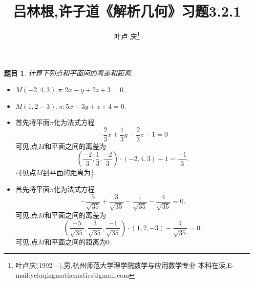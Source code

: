 \documentclass[a4paper]{article}
\newtheorem*{exe}{题目}
\newenvironment{exercise}
{\bigskip\begin{mdframed}\begin{exe}}
    {\end{exe}\end{mdframed}\bigskip}
\begin{document}
\title{\huge{\bf{吕林根,许子道《解析几何》习题3.2.1}}} \author{\small{叶卢
    庆\footnote{叶卢庆(1992---),男,杭州师范大学理学院数学与应用数学专业
      本科在读,E-mail:yeluqingmathematics@gmail.com}}}
\maketitle
\begin{exercise}
计算下列点和平面间的离差和距离.
\begin{itemize}
\item $M(-2,4,3)$,$\pi:2x-y+2z+3=0$.
\item $M(1,2-3),\pi:5x-3y+z+4=0$.
\end{itemize}
\end{exercise}
\begin{itemize}
\item 首先将平面$\pi$化为法式方程
$$
-\frac{2}{3}x+\frac{1}{3}y-\frac{2}{3}z-1=0
$$
可见,点$M$和平面之间的离差为
$$
(\frac{-2}{3},\frac{1}{3},\frac{-2}{3})\cdot (-2,4,3)-1=\frac{-1}{3}.
$$
可见点$M$到平面的距离为$\frac{1}{3}$.
\item 首先将平面$\pi$化为法式方程
$$
-\frac{5}{\sqrt{35}}+\frac{3}{\sqrt{35}}-\frac{1}{\sqrt{35}}-\frac{4}{\sqrt{35}}=0.
$$
可见,点$M$和平面之间的离差为
$$
(\frac{-5}{\sqrt{35}},\frac{3}{\sqrt{35}},\frac{-1}{\sqrt{35}})\cdot (1,2,-3)-\frac{4}{\sqrt{35}}=0.
$$
可见,点$M$和平面之间的距离为$0$.
\end{itemize}
\end{document}
